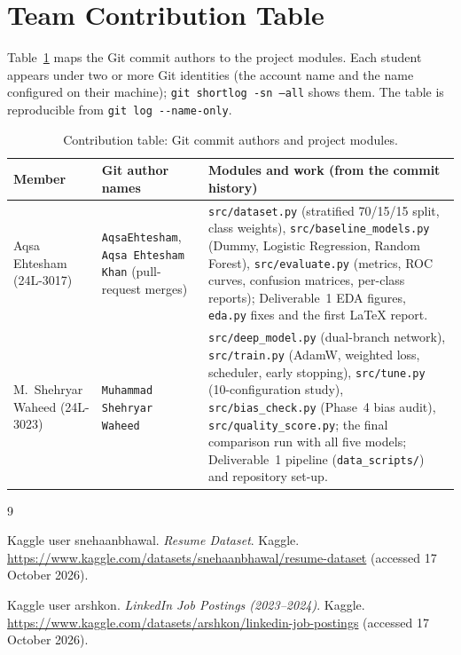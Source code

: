 \documentclass[11pt,a4paper]{article}
\begin{document}
\section{Team Contribution Table}
Table~\ref{tab:contrib} maps the Git commit authors to the project modules.
Each student appears under two or more Git identities (the account name and the
name configured on their machine); \texttt{git shortlog -sn --all} shows them.
The table is reproducible from \texttt{git log -{}-name-only}.

\begin{table}[htbp]
  \centering
  \footnotesize
  \begin{tabularx}{\textwidth}{@{}>{\raggedright\arraybackslash}p{2.6cm}>{\raggedright\arraybackslash}p{2.8cm}>{\raggedright\arraybackslash}X@{}}
    \toprule
    Member & Git author names & Modules and work (from the commit history) \\
    \midrule
    Aqsa Ehtesham (24L-3017) &
    \texttt{AqsaEhtesham}, \texttt{Aqsa Ehtesham Khan} (pull-request merges) &
    \texttt{src/dataset.py} (stratified 70/15/15 split, class weights),
    \texttt{src/baseline\_models.py} (Dummy, Logistic Regression, Random
    Forest), \texttt{src/evaluate.py} (metrics, ROC curves, confusion
    matrices, per-class reports); Deliverable~1 EDA figures, \texttt{eda.py}
    fixes and the first LaTeX report. \\
    \addlinespace
    M.\ Shehryar Waheed (24L-3023) &
    \texttt{Muhammad Shehryar Waheed} &
    \texttt{src/deep\_model.py} (dual-branch network),
    \texttt{src/train.py} (AdamW, weighted loss, scheduler, early stopping),
    \texttt{src/tune.py} (10-configuration study),
    \texttt{src/bias\_check.py} (Phase~4 bias audit),
    \texttt{src/quality\_score.py}; the final comparison run with all five
    models; Deliverable~1 pipeline (\texttt{data\_scripts/}) and
    repository set-up. \\
    \bottomrule
  \end{tabularx}
  \caption{Contribution table: Git commit authors and project modules.}
  \label{tab:contrib}
\end{table}

\FloatBarrier

\begin{thebibliography}{9}

Kaggle user snehaanbhawal. \emph{Resume Dataset}. Kaggle.
\url{https://www.kaggle.com/datasets/snehaanbhawal/resume-dataset}
(accessed 17 October 2026).

Kaggle user arshkon. \emph{LinkedIn Job Postings (2023--2024)}. Kaggle.
\url{https://www.kaggle.com/datasets/arshkon/linkedin-job-postings}
(accessed 17 October 2026).

\end{thebibliography}
\end{document}

